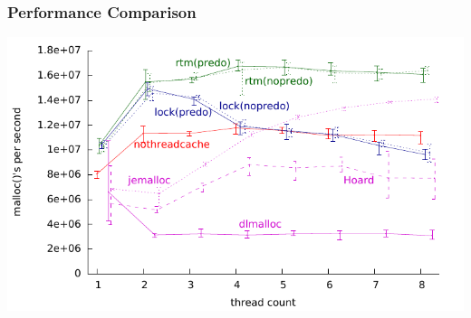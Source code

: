 \documentclass[xcolor=dvipsnames,14pt]{beamer}
\begin{document}

\begin{frame}
\frametitle{Performance Comparison}
\hspace*{-.7cm}\includegraphics{new-malloc-test-1K-aggregated.pdf}
\end{frame}
\end{document}

